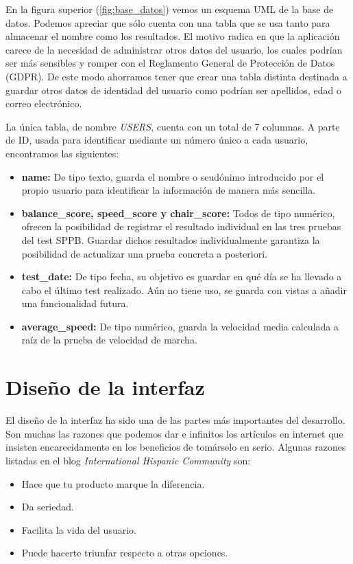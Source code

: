 En la figura superior (\ref{fig:base_datos}) vemos un esquema UML de la base de datos. Podemos apreciar que sólo cuenta con una tabla que se usa tanto para almacenar el nombre como los resultados. El motivo radica en que la aplicación carece de la necesidad de administrar otros datos del usuario, los cuales podrían ser más sensibles y romper con el Reglamento General de Protección de Datos (GDPR). De este modo ahorramos tener que crear una tabla distinta destinada a guardar otros datos de identidad del usuario como podrían ser apellidos, edad o correo electrónico.

La única tabla, de nombre \textit{USERS}, cuenta con un total de 7 columnas. A parte de ID, usada para identificar mediante un número único a cada usuario, encontramos las siguientes:
\begin{itemize}
    \item \textbf{name:} De tipo texto, guarda el nombre o seudónimo introducido por el propio usuario para identificar la información de manera más sencilla.
    
    \item \textbf{balance\_score, speed\_score y chair\_score:} Todos de tipo numérico, ofrecen la posibilidad de registrar el resultado individual en las tres pruebas del test SPPB. Guardar dichos resultados individualmente garantiza la posibilidad de actualizar una prueba concreta a posteriori.
    
    \item \textbf{test\_date:} De tipo fecha, su objetivo es guardar en qué día se ha llevado a cabo el último test realizado. Aún no tiene uso, se guarda con vistas a añadir una funcionalidad futura.
    
    \item \textbf{average\_speed:} De tipo numérico, guarda la velocidad media calculada a raíz de la prueba de velocidad de marcha.
\end{itemize}

\section{Diseño de la interfaz}

El diseño de la interfaz ha sido una de las partes más importantes del desarrollo. Son muchas las razones que podemos dar e infinitos los artículos en internet que insisten encarecidamente en los beneficios de tomárselo en serio. Algunas razones listadas en el blog \textit{International Hispanic Community} \cite{design} son:
\begin{itemize}
    \item Hace que tu producto marque la diferencia.
    \item Da seriedad.
    \item Facilita la vida del usuario.
    \item Puede hacerte triunfar respecto a otras opciones.
\end{itemize}

